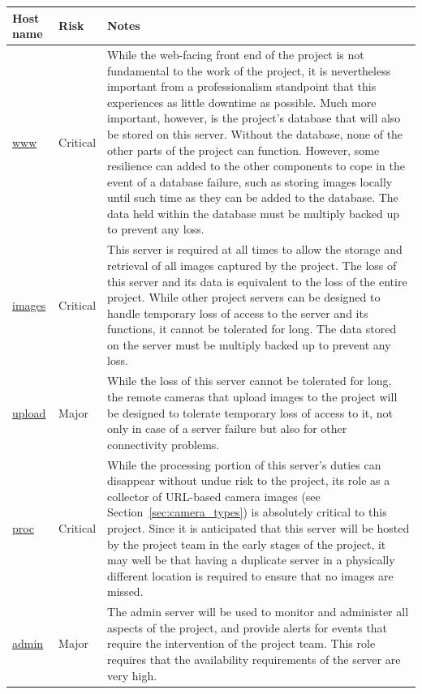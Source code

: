 \documentclass[11pt]{article}
\begin{document}
\begin{table}
\begin{tabular}{ | p{0.45in} | p{0.8in} | p{4.65in} | }
\hline
\textbf{Host name} & \textbf{Risk} & \textbf{Notes} \\
\hline
\url{www} & Critical & While the web-facing front end of the project is not fundamental to the work of the project, it is nevertheless important from a professionalism standpoint that this experiences as little downtime as possible. Much more important, however, is the project's database that will also be stored on this server. Without the database, none of the other parts of the project can function. However, some resilience can added to the other components to cope in the event of a database failure, such as storing images locally until such time as they can be added to the database. The data held within the database must be multiply backed up to prevent any loss. \\
\hline
\url{images} & Critical & This server is required at all times to allow the storage and retrieval of all images captured by the project. The loss of this server and its data is equivalent to the loss of the entire project. While other project servers can be designed to handle temporary loss of access to the server and its functions, it cannot be tolerated for long. The data stored on the server must be multiply backed up to prevent any loss. \\
\hline
\url{upload} & Major & While the loss of this server cannot be tolerated for long, the remote cameras that upload images to the project will be designed to tolerate temporary loss of access to it, not only in case of a server failure but also for other connectivity problems. \\
\hline
\url{proc} & Critical & While the processing portion of this server's duties can disappear without undue risk to the project, its role as a collector of URL-based camera images (see Section~\ref{sec:camera_types}) is absolutely critical to this project. Since it is anticipated that this server will be hosted by the project team in the early stages of the project, it may well be that having a duplicate server in a physically different location is required to ensure that no images are missed. \\
\hline
\url{admin} & Major & The admin server will be used to monitor and administer all aspects of the project, and provide alerts for events that require the intervention of the project team. This role requires that the availability requirements of the server are very high. \\

\end{tabular}
\end{table}
\end{document}
